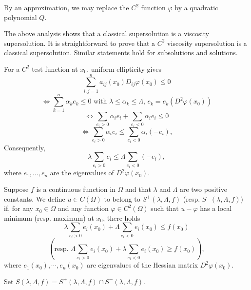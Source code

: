 \begin{remark}\label{hanlin:ch05-rem-5-2} By an approximation, we may replace the $C^2$ function $\varphi$ by a
quadratic polynomial $Q$.
\end{remark}

\begin{remark}\label{hanlin:ch05-rem-5-3} The above analysis shows that a classical supersolution is a viscosity
supersolution. It is straightforward to prove that a $C^2$ viscosity supersolution
is a classical supersolution. Similar statements hold for subsolutions and solutions.

\end{remark}
\medskip


For a $C^2$ test function at $x_0$, uniform ellipticity gives
\[
\sum_{i,j=1}^n a_{ij}(x_0)D_{ij}\varphi(x_0) \le 0
\]
\[
\Longleftrightarrow \sum_{k=1}^n \alpha_k e_k \le 0 \text{ with } \lambda \le \alpha_k \le \Lambda,\, e_k = e_k(D^2\varphi(x_0))
\]
\[
\Longleftrightarrow \sum_{e_i>0} \alpha_i e_i + \sum_{e_i<0} \alpha_i e_i \le 0
\]
\[
\Longleftrightarrow \sum_{e_i>0} \alpha_i e_i \le \sum_{e_i<0} \alpha_i(-e_i),
\]
Consequently,
\[
\lambda \sum_{e_i>0} e_i \le \Lambda \sum_{e_i<0} (-e_i),
\]
where $e_1,\ldots,e_n$ are the eigenvalues of $D^2\varphi(x_0)$.

\begin{definition}\label{hanlin:ch05-def-5-4} Suppose $f$ is a continuous function in $\Omega$ and that $\lambda$ and $\Lambda$
are two positive constants. We define $u \in C(\Omega)$ to belong to $S^+(\lambda,\Lambda,f)$ (resp.
$S^-(\lambda,\Lambda,f)$) if, for any $x_0 \in \Omega$ and any function $\varphi \in C^2(\Omega)$ such that $u - \varphi$ has a
local minimum (resp. maximum) at $x_0$, there holds
\[
\lambda \sum_{e_i>0} e_i(x_0) + \Lambda \sum_{e_i<0} e_i(x_0) \le f(x_0)
\]
\[
(\text{resp. } \Lambda \sum_{e_i>0} e_i(x_0) + \lambda \sum_{e_i<0} e_i(x_0) \ge f(x_0)),
\]
where $e_1(x_0),\cdots,e_n(x_0)$ are eigenvalues of the Hessian matrix $D^2\varphi(x_0)$.


Set $S(\lambda,\Lambda,f)=S^+(\lambda,\Lambda,f)\cap S^-(\lambda,\Lambda,f)$.
\end{definition}




